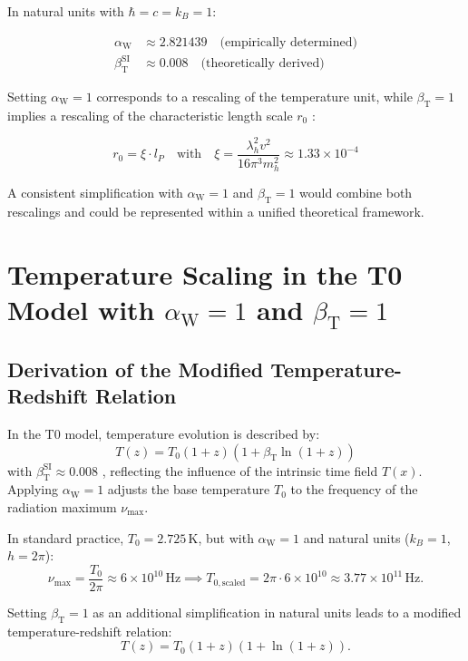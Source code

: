 \documentclass[12pt,a4paper]{article}
\newcommand{\Tfield}{T(x)}
\newcommand{\betaT}{\beta_{\text{T}}}
\newcommand{\alphaW}{\alpha_{\text{W}}}
\begin{document}
	In natural units with \(\hbar = c = k_B = 1\):
	
	\begin{align}
		\alphaW &\approx 2.821439 \quad \text{(empirically determined)} \\
		\betaT^{\text{SI}} &\approx 0.008 \quad \text{(theoretically derived)}
	\end{align}
	
	Setting \(\alphaW = 1\) corresponds to a rescaling of the temperature unit, while \(\betaT = 1\) implies a rescaling of the characteristic length scale \(r_0\) \cite{pascher_params_2025}:
	
	\begin{equation}
		r_0 = \xi \cdot l_P \quad \text{with} \quad \xi = \frac{\lambda_h^2 v^2}{16\pi^3 m_h^2} \approx 1.33 \times 10^{-4}
	\end{equation}
	
	A consistent simplification with \(\alphaW = 1\) and \(\betaT = 1\) would combine both rescalings and could be represented within a unified theoretical framework.
	
	\section{Temperature Scaling in the T0 Model with \(\alphaW = 1\) and \(\betaT = 1\)}
	
	\subsection{Derivation of the Modified Temperature-Redshift Relation}
	
	In the T0 model, temperature evolution is described by:
	\begin{equation}
		T(z) = T_0 (1 + z) (1 + \betaT \ln(1 + z))
	\end{equation}
	with \(\betaT^{\text{SI}} \approx 0.008\) \cite{pascher_messdifferenzen_2025}, reflecting the influence of the intrinsic time field \(\Tfield\). Applying \(\alphaW = 1\) adjusts the base temperature \(T_0\) to the frequency of the radiation maximum \(\nu_{\text{max}}\).
	
	In standard practice, \(T_0 = 2.725 \, \text{K}\), but with \(\alphaW = 1\) and natural units (\(k_B = 1\), \(h = 2\pi\)):
	\[
	\nu_{\text{max}} = \frac{T_0}{2\pi} \approx 6 \times 10^{10} \, \text{Hz} \implies T_{0,\text{scaled}} = 2\pi \cdot 6 \times 10^{10} \approx 3.77 \times 10^{11} \, \text{Hz}.
	\]
	
	Setting \(\betaT = 1\) as an additional simplification in natural units leads to a modified temperature-redshift relation:
	\[
	T(z) = T_0 (1 + z) (1 + \ln(1 + z)).
	\]
	
\end{document}
